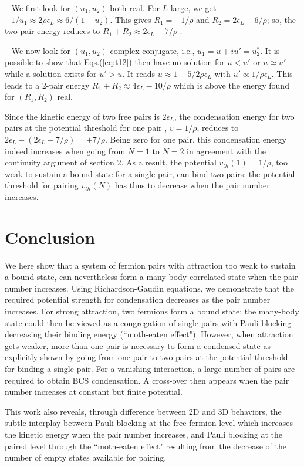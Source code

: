 \documentclass[5p,twocolumn]{elsarticle}
\begin{document}
-- We first look for $(u_1,u_2)$ both real. For $L$ large, we get $-1/u_1\approx 2 \rho\epsilon_L \approx 6/(1-u_2)$. This gives $R_1=-1/\rho$ and $R_2=2 \epsilon_L-6/\rho$; so, the two-pair energy reduces to $R_1+R_2\approx2 \epsilon_L-7/\rho$ .

--  We now look for $(u_1,u_2)$ complex conjugate, i.e., $u_1=u+iu'=u^*_2$. It is possible to show that Eqs.(\ref{eq:t12}) then have no solution for $u<u'$ or $u\simeq u'$ while a solution exists for $u'>u$. It reads $u\approx1-5/2\rho\epsilon_L$ with $u'\propto1/\rho\epsilon_L$. This leads to a 2-pair energy $R_1+R_2\approx4 \epsilon_L-10/\rho$ which is above the energy found for $(R_1,R_2)$ real.

Since the kinetic energy of two free pairs is $2\epsilon_L$, the condensation energy for two pairs at the potential threshold for one pair , $v=1/\rho$, reduces to 
$ 2\epsilon_L-(2 \epsilon_L-7/\rho)=+7/\rho$. Being zero for one pair, this condensation energy indeed increases when going from $N=1$ to $N=2$ in agreement with the continuity argument of section 2. As a result, the potential $v_{th}(1)=1/\rho$, too weak to sustain a bound state for a single pair, can bind two pairs: the potential threshold for pairing $v_{th}(N)$ has thus to decrease when the pair number increases.

 

\section{Conclusion\label{sec:conclusion}}
We here show that a system of fermion pairs with attraction too weak to sustain a bound state, can nevertheless form a many-body correlated state when the pair number increases.  Using Richardson-Gaudin equations, we demonstrate that the required potential strength for condensation decreases as the pair number increases.  For strong attraction, two fermions form a bound state; the many-body state could then be viewed as a congregation of single pairs with Pauli blocking decreasing their binding energy (``moth-eaten effect").  However, when attraction gets weaker, more than one pair is necessary to form a condensed state as explicitly shown by going from one pair to two pairs at the potential threshold for binding a single pair.  For a vanishing interaction, a large number of pairs are required to obtain BCS condensation.   A cross-over then appears when the pair number increases at constant but finite potential.

 This work also reveals, through difference between 2D and 3D behaviors, the subtle interplay between Pauli blocking at the free fermion level which increases the kinetic energy when the pair number increases, and Pauli blocking at the paired level through the ``moth-eaten effect" resulting from the decrease of the number of empty states available for pairing.
\end{document}
